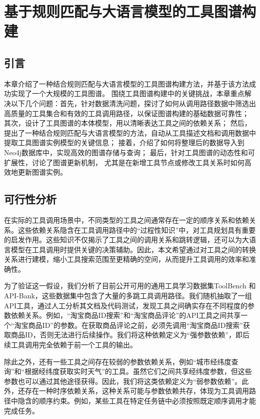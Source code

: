 \chapter{基于规则匹配与大语言模型的工具图谱构建}

\section{引言}

本章介绍了一种结合规则匹配与大语言模型的工具图谱构建方法，并基于该方法成功实现了一个大规模的工具图谱。
围绕工具图谱构建中的关键挑战，本章重点解决以下几个问题：首先，针对数据清洗问题，探讨了如何从调用路径数据中筛选出高质量的工具集合和有效的工具调用路径，以保证图谱构建的基础数据可靠性；
其次，设计了工具图谱的本体模型，用以清晰表达工具之间的依赖关系；
然后，提出了一种结合规则匹配与大语言模型的方法，自动从工具描述文档和调用数据中提取工具图谱实例模型的关键信息；
接着，介绍了如何将整理后的数据导入到Neo4j数据库中，实现高效的图谱存储与查询；
最后，针对工具图谱的动态性和可扩展性，讨论了图谱更新机制，
尤其是在新增工具节点或修改工具关系时如何高效地更新图谱实例。

\section{可行性分析}

在实际的工具调用场景中，不同类型的工具之间通常存在一定的顺序关系和依赖关系。这些依赖关系隐含在工具调用路径中的“过程性知识”中，对工具规划具有重要的启发作用。这些知识不仅揭示了工具之间的调用关系和跳转逻辑，还可以为大语言模型在工具调用时提供关键的决策辅助。因此，本文希望通过对工具之间的转换关系进行建模，缩小工具搜索范围至更精确的空间，从而提升工具调用的效率和准确性。

为了验证这一假设，我们分析了目前公开可用的通用工具学习数据集ToolBench\cite{Qin2023} 和 API-Bank\cite{Li2023c}，这些数据集中包含了大量的多跳工具调用路径。我们随机抽取了一组API工具，通过人工分析其文档及代码测试，发现工具之间确实存在不同程度的参数依赖关系。例如，“淘宝商品ID搜索”和“淘宝商品评论”的API工具之间共享一个“淘宝商品ID”的参数。在获取商品评论之前，必须先调用“淘宝商品ID搜索”获取商品ID，否则无法进行后续操作。我们将这种依赖定义为“强参数依赖”，即后续工具调用完全依赖于前一个工具的输出。

除此之外，还有一些工具之间存在较弱的参数依赖关系，例如“城市经纬度查询”和“根据经纬度获取实时天气”的工具。虽然它们之间共享经纬度参数，但这些参数也可以通过其他途径获得。因此，我们将这类依赖定义为“弱参数依赖”。此外，还存在一种时序依赖关系，这种关系可能与参数依赖共存，体现为工具调用路径中隐含的顺序约束。例如，某些工具在特定任务链中必须按照既定顺序调用才能完成任务。


